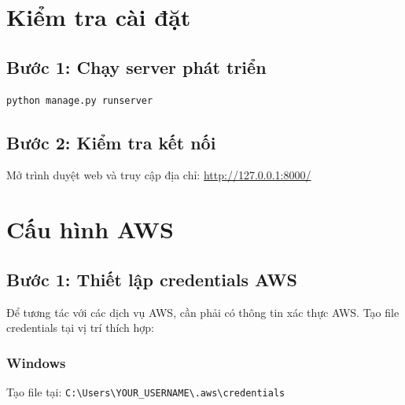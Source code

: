 \section{Kiểm tra cài đặt}

\subsection{Bước 1: Chạy server phát triển}

\begin{lstlisting}[language=bash]
python manage.py runserver
\end{lstlisting}


\subsection{Bước 2: Kiểm tra kết nối}

Mở trình duyệt web và truy cập địa chỉ: \url{http://127.0.0.1:8000/}



\section{Cấu hình AWS}

\subsection{Bước 1: Thiết lập credentials AWS}

Để tương tác với các dịch vụ AWS, cần phải có thông tin xác thực AWS. Tạo file credentials tại vị trí thích hợp:

\subsubsection{Windows}
Tạo file tại: \texttt{C:\textbackslash Users\textbackslash YOUR\_USERNAME\textbackslash .aws\textbackslash credentials}

